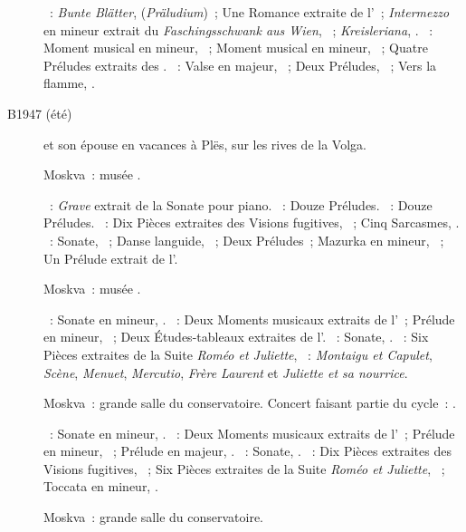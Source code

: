 \begin{description}
 \textsc{\Schumann{}}~: \emph{Bunte Blätter},  
 (\emph{Präludium})~; Une Romance extraite de l'~;
 \emph{Intermezzo} en \kE \Flat mineur extrait du \emph{Faschingsschwank aus
 Wien},  ~; \emph{Kreisleriana}, .
 \textsc{\Rachmaninov{}}~: Moment musical en \kE \Flat mineur, 
 ~; Moment musical en \kB mineur,  ~; Quatre
 Préludes extraits des .
 \textsc{\Scriabine{}}~: Valse en \kA \Flat majeur, ~; Deux
 Préludes, ~; Vers la flamme, .
 \item[B1947 (été)]
 \VSofronitsky{} et son épouse \VDushinova{} en vacances à Plës, sur les
 rives de la Volga.
 \item[\DateWithWeekDay{1947-10-19}]
 Moskva~: musée \Scriabine{}.

 \textsc{\BogdanovBerezovsky{}}~: \emph{Grave} extrait de la Sonate pour
 piano.
 \textsc{\Chostakovitch{}}~: Douze Préludes.
 \textsc{\Kabalevski{}}~: Douze Préludes.
 \textsc{\Prokofiev{}}~: Dix Pièces extraites des Visions fugitives,
 ~; Cinq Sarcasmes, .
 \textsc{\Scriabine{}}~: Sonate, ~; Danse languide, 
 ~; Deux Préludes~; Mazurka en \kE mineur,  ~;
 Un Prélude extrait de l'.
 \item[\DateWithWeekDay{1947-11-21}]
 Moskva~: musée \Scriabine{}.

 \textsc{\Beethoven{}}~: Sonate en \kF mineur, .
 \textsc{\Rachmaninov{}}~: Deux Moments musicaux extraits de l'~;
 Prélude en \kC mineur,  ~; Deux Études-tableaux
 extraites de l'.
 \textsc{\Scriabine{}}~: Sonate, .
 \textsc{\Prokofiev{}}~: Six Pièces extraites de la Suite \emph{Roméo et
 Juliette}, ~: \emph{Montaigu et Capulet}, \emph{Scène},
 \emph{Menuet}, \emph{Mercutio}, \emph{Frère Laurent} et \emph{Juliette et
 sa nourrice}.
 \item[\DateWithWeekDay{1947-11-26}]
 Moskva~: grande salle du conservatoire.
 Concert faisant partie du cycle~: .

 \textsc{\Beethoven{}}~: Sonate en \kF mineur, .
 \textsc{\Rachmaninov{}}~: Deux Moments musicaux extraits de l'~;
 Prélude en \kC mineur,  ~; Prélude en \kG majeur,
  .
 \textsc{\Scriabine{}}~: Sonate, .
 \textsc{\Prokofiev{}}~: Dix Pièces extraites des Visions fugitives,
 ~; Six Pièces extraites de la Suite \emph{Roméo et Juliette},
 ~; Toccata en \kD mineur, .
 \item[\DateWithWeekDay{1947-12-17}]
 Moskva~: grande salle du conservatoire.


\end{description}
